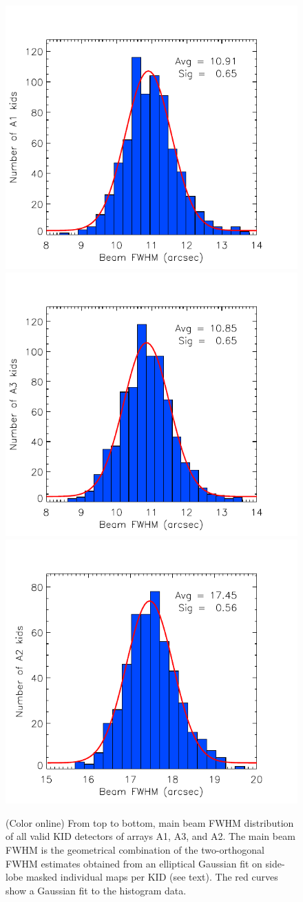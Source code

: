 \documentclass[]{aa} %
\begin{document}
\begin{figure}[h]
  \centering
  \includegraphics[clip=true,width=0.68\linewidth]{plot_histo_A1_fwhm_20170424s123.pdf}
  \includegraphics[clip=true,width=0.68\linewidth]{plot_histo_A3_fwhm_20170424s123.pdf}
  \includegraphics[clip=true,width=0.68\linewidth]{plot_histo_A2_fwhm_20170424s123.pdf}
  
\caption{(Color online) From top to bottom, main beam FWHM distribution of all valid KID detectors of arrays A1, A3, and A2. The main beam FWHM is the geometrical combination of the two-orthogonal FWHM estimates obtained from an elliptical Gaussian fit on side-lobe masked individual maps per KID (see text). The red curves show a Gaussian fit to the histogram data.}
  \label{fig:focalplane_histo}
\end{figure}
\end{document}
